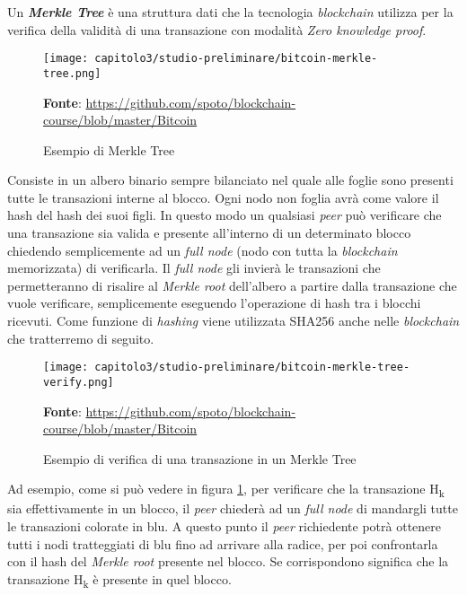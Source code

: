 Un \textbf{\textit{Merkle Tree}} è una struttura dati che la tecnologia \textit{blockchain} utilizza per la verifica della validità di una transazione con modalità \textit{Zero knowledge proof}.

\begin{figure}[h!]
  \centering
  \texttt{[image: capitolo3/studio-preliminare/bitcoin-merkle-tree.png]}
  \caption{Esempio di Merkle Tree}
  \textbf{Fonte}: \href{https://github.com/spoto/blockchain-course/blob/master/Bitcoin}{https://github.com/spoto/blockchain-course/blob/master/Bitcoin}
\end{figure}

Consiste in un albero binario sempre bilanciato nel quale alle foglie sono presenti tutte le transazioni interne al blocco. Ogni nodo non foglia avrà come valore il hash del hash dei suoi figli. In questo modo un qualsiasi \textit{peer} può verificare che una transazione sia valida e presente all'interno di un determinato blocco chiedendo semplicemente ad un \textit{full node} (nodo con tutta la \textit{blockchain} memorizzata) di verificarla. Il \textit{full node} gli invierà le transazioni che permetteranno di risalire al \textit{Merkle root} dell'albero a partire dalla transazione che vuole verificare, semplicemente eseguendo l'operazione di hash tra i blocchi ricevuti. Come funzione di \textit{hashing} viene utilizzata SHA256 anche nelle \textit{blockchain} che tratterremo di seguito.

\begin{figure}[h!]
  \centering
  \texttt{[image: capitolo3/studio-preliminare/bitcoin-merkle-tree-verify.png]}
  \caption{Esempio di verifica di una transazione in un Merkle Tree}
  \textbf{Fonte}: \href{https://github.com/spoto/blockchain-course/blob/master/Bitcoin}{https://github.com/spoto/blockchain-course/blob/master/Bitcoin}
  \label{fig:merkle-tree-verify}
\end{figure}

Ad esempio, come si può vedere in figura \ref{fig:merkle-tree-verify}, per verificare che la transazione H\textsubscript{k} sia effettivamente in un blocco, il \textit{peer} chiederà ad un \textit{full node} di mandargli tutte le transazioni colorate in blu. A questo punto il \textit{peer} richiedente potrà ottenere tutti i nodi tratteggiati di blu fino ad arrivare alla radice, per poi confrontarla con il hash del \textit{Merkle root} presente nel blocco. Se corrispondono significa che la transazione H\textsubscript{k} è presente in quel blocco. 

